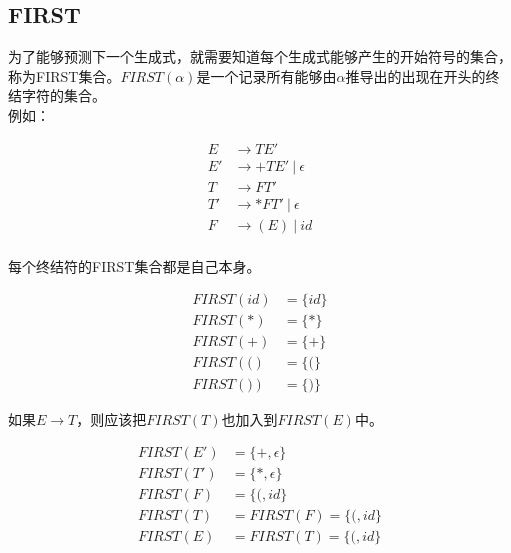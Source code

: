 \subsection{FIRST}

为了能够预测下一个生成式，就需要知道每个生成式能够产生的开始符号的集合，称为FIRST集合。$ FIRST(\alpha) $是一个记录所有能够由$ \alpha $推导出的出现在开头的终结字符的集合。\\

例如：

\vspace{-1cm}

\begin{align*}
    E  & \rightarrow TE'               \\
    E' & \rightarrow +TE'\ |\ \epsilon \\
    T  & \rightarrow FT'               \\
    T' & \rightarrow *FT'\ |\ \epsilon \\
    F  & \rightarrow  (E)\ |\ id       \\
\end{align*}

每个终结符的FIRST集合都是自己本身。

\vspace{-1cm}

\begin{align*}
    FIRST(id)       & = \{id\}       \\
    FIRST(*)        & = \{*\}        \\
    FIRST(+)        & = \{+\}        \\
    FIRST(\text{(}) & = \{\text{(}\} \\
    FIRST(\text{)}) & = \{\text{)}\}
\end{align*}

如果$ E \rightarrow T $，则应该把$ FIRST(T) $也加入到$ FIRST(E) $中。

\vspace{-1cm}

\begin{align*}
    FIRST(E') & = \{+, \epsilon\}             \\
    FIRST(T') & = \{*, \epsilon\}             \\
    FIRST(F)  & = \{\text{(}, id\}            \\
    FIRST(T)  & = FIRST(F) = \{\text{(}, id\} \\
    FIRST(E)  & = FIRST(T) = \{\text{(}, id\}
\end{align*}

